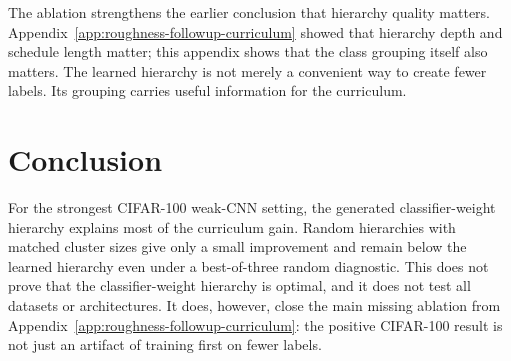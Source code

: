 The ablation strengthens the earlier conclusion that hierarchy quality matters.
Appendix~\ref{app:roughness-followup-curriculum} showed that hierarchy depth and
schedule length matter; this appendix shows that the class grouping itself also
matters. The learned hierarchy is not merely a convenient way to create fewer
labels. Its grouping carries useful information for the curriculum.

\section{Conclusion}

For the strongest CIFAR-100 weak-CNN setting, the generated classifier-weight
hierarchy explains most of the curriculum gain. Random hierarchies with matched
cluster sizes give only a small improvement and remain below the learned
hierarchy even under a best-of-three random diagnostic. This does not prove that
the classifier-weight hierarchy is optimal, and it does not test all datasets or
architectures. It does, however, close the main missing ablation from
Appendix~\ref{app:roughness-followup-curriculum}: the positive CIFAR-100 result
is not just an artifact of training first on fewer labels.
